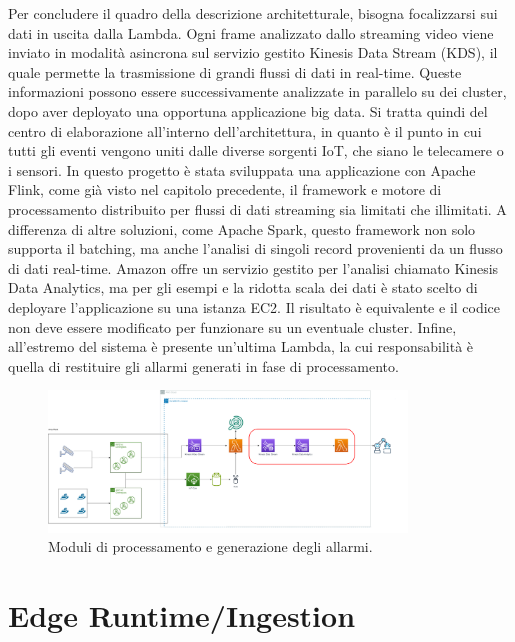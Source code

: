 Per concludere il quadro della descrizione architetturale, bisogna focalizzarsi sui dati in uscita dalla Lambda. Ogni frame analizzato dallo streaming video viene inviato in modalità asincrona sul servizio gestito Kinesis Data Stream (KDS), il quale permette la trasmissione di grandi flussi di dati in real-time. Queste informazioni possono essere successivamente analizzate in parallelo su dei cluster, dopo aver deployato una opportuna applicazione big data. Si tratta quindi del centro di elaborazione all'interno dell'architettura, in quanto è il punto in cui tutti gli eventi vengono uniti dalle diverse sorgenti IoT, che siano le telecamere o i sensori. In questo progetto è stata sviluppata una applicazione con Apache Flink, come già visto nel capitolo precedente, il framework e motore di processamento distribuito per flussi di dati streaming sia limitati che illimitati. 
A differenza di altre soluzioni, come Apache Spark, questo framework non solo supporta il batching, ma anche l’analisi di singoli record provenienti da un flusso di dati real-time. Amazon offre un servizio gestito per l’analisi chiamato Kinesis Data Analytics, ma per gli esempi e la ridotta scala dei dati è stato scelto di deployare l’applicazione su una istanza EC2. Il risultato è equivalente e il codice non deve essere modificato per funzionare su un eventuale cluster. Infine, all'estremo del sistema è presente un'ultima Lambda, la cui responsabilità è quella di restituire gli allarmi generati in fase di processamento. 

\begin{figure}[htbp]
    \centering
    \includegraphics[width=0.85\textwidth]{figures/processing-subsystem.png}
    \caption{Moduli di processamento e generazione degli allarmi.} 
    \label{fig:processing-subsystem}
\end{figure}

\section{Edge Runtime/Ingestion}
